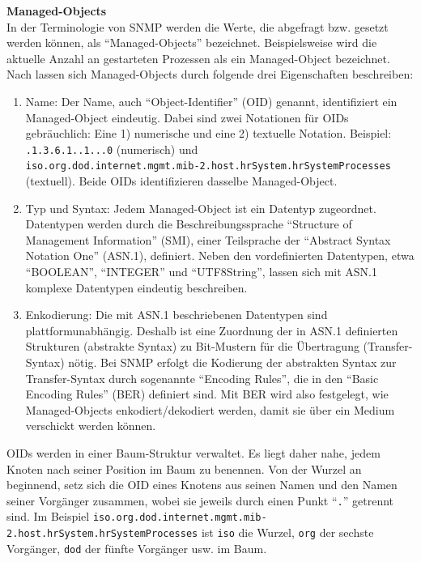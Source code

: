 \documentclass[12pt,ngerman,toc=listofnumbered,toc=bibliographynumbered,toc=index,headsepline=true]{scrbook}
\begin{document}
\textbf{Managed-Objects}\\[1ex]
In der Terminologie von SNMP werden die Werte, die abgefragt bzw. gesetzt
werden können, als \enquote{Managed-Objects} bezeichnet. Beispielsweise wird die
aktuelle Anzahl an gestarteten Prozessen als ein Managed-Object bezeichnet. Nach
\cite{Mauro01} lassen sich Managed-Objects durch folgende drei Eigenschaften
beschreiben:
\begin{enumerate}
  \item Name: Der Name, auch \enquote{Object-Identifier} (OID) genannt,
  identifiziert ein Managed-Object eindeutig. Dabei sind zwei Notationen für
  OIDs gebräuchlich: Eine 1) numerische und eine 2) textuelle Notation.
  Beispiel: \texttt{.1.3.6.1.\-.1...0} (numerisch) und \\  \texttt{iso.org.\-dod.\-in\-ter\-net.mgmt.mib-2.host.hrSystem.hrSystemProcesses}
  (textuell). Beide OIDs identifizieren dasselbe Managed-Object.
  \item Typ und Syntax: Jedem Managed-Object ist ein Datentyp zugeordnet.
  Datentypen werden durch die Beschreibungssprache \enquote{Structure of
  Management Information} (SMI), einer Teilsprache der \enquote{Abstract Syntax
  Notation One} (ASN.1), definiert. Neben den vordefinierten Datentypen, etwa
  \enquote{BOOLEAN}, \enquote{INTEGER} und \enquote{UTF8String}, lassen sich mit
  ASN.1 komplexe Datentypen eindeutig beschreiben.
  \item Enkodierung: Die mit ASN.1 beschriebenen Datentypen sind
  plattformunabhängig. Deshalb ist eine Zuordnung der in ASN.1
  definierten Strukturen (abstrakte Syntax) zu Bit-Mustern für die Übertragung
  (Transfer-Syntax) nötig. Bei SNMP erfolgt die Kodierung der abstrakten Syntax
  zur Transfer-Syntax durch sogenannte \enquote{Encoding Rules}, die in den
  \enquote{Basic Encoding Rules} (BER) definiert sind. Mit BER wird also
  festgelegt, wie Managed-Objects enkodiert/dekodiert werden, damit sie über ein
  Medium verschickt werden können.
\end{enumerate}
OIDs werden in einer Baum-Struktur verwaltet. Es liegt daher nahe, jedem Knoten
nach seiner Position im Baum zu benennen. Von der Wurzel an beginnend, setz
sich die OID eines Knotens aus seinen Namen und den Namen seiner Vorgänger
zusammen, wobei sie jeweils durch einen Punkt \enquote{\texttt{.}} getrennt sind.
Im Beispiel
\texttt{iso.org.\-dod.\-in\-ter\-net.mgmt.mib-2.host.hrSystem.hr\-Sys\-tem\-Pro\-ces\-ses}
ist \texttt{iso} die Wurzel, \texttt{org} der sechste Vorgänger, \texttt{dod}
der fünfte Vorgänger usw. im Baum.
\end{document}
